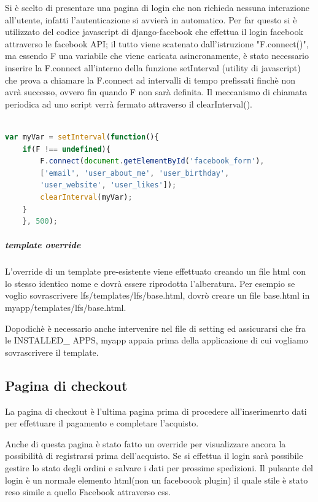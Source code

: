 Si è scelto di presentare una pagina di login che non richieda nessuna interazione all'utente, infatti l'autenticazione si avvierà in automatico. Per far questo si è utilizzato del codice javascript di django-facebook che effettua il login facebook attraverso le facebook API; il tutto viene scatenato dall'istruzione "F.connect()", ma essendo F una variabile che viene caricata asincronamente, è stato necessario inserire la F.connect all'interno della funzione setInterval (utility di javascript) che prova a chiamare la F.connect ad intervalli di tempo prefissati finchè non avrà successo, ovvero fin quando F non sarà definita. Il meccanismo di chiamata periodica ad uno script verrà fermato attraverso il clearInterval().

\begin{lstlisting}[language=JavaScript]

var myVar = setInterval(function(){
    if(F !== undefined){
        F.connect(document.getElementById('facebook_form'), 
        ['email', 'user_about_me', 'user_birthday', 
        'user_website', 'user_likes']);
        clearInterval(myVar);
    }
    }, 500);

\end{lstlisting}

\subparagraph{template override}
L'override di un template pre-esistente viene effettuato creando un file html con lo stesso identico nome e dovrà essere riprodotta l'alberatura. Per esempio se voglio sovrascrivere lfs/templates/lfs/base.html, dovrò creare un file base.html in myapp/templates/lfs/base.html. 

Dopodichè è necessario anche intervenire nel file di setting ed assicurarsi che fra le INSTALLED\_ APPS, myapp appaia prima della applicazione di cui vogliamo sovrascrivere il template.

\subsection{Pagina di checkout}
La pagina di checkout è l'ultima pagina prima di procedere all'inserimenrto dati per effettuare il pagamento e completare l'acquisto.

Anche di questa pagina è stato fatto un override per visualizzare ancora la possibilità di registrarsi prima dell'acquisto. Se si effettua il login sarà possibile gestire lo stato degli ordini e salvare i dati per prossime spedizioni. Il pulsante del login è un normale elemento html(non un faceboook plugin) il quale stile è stato reso simile a quello Facebook attraverso css. 

